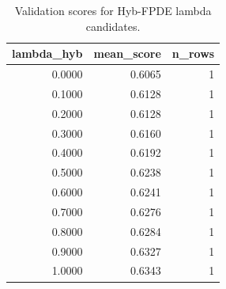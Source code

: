 \begin{table}[t]
\caption{Validation scores for Hyb-FPDE lambda candidates.}
\label{tab:lambda_distribution_computed}
\centering
\begin{tabular}{rrr}
\toprule
lambda\_hyb & mean\_score & n\_rows \\
\midrule
0.0000 & 0.6065 & 1 \\
0.1000 & 0.6128 & 1 \\
0.2000 & 0.6128 & 1 \\
0.3000 & 0.6160 & 1 \\
0.4000 & 0.6192 & 1 \\
0.5000 & 0.6238 & 1 \\
0.6000 & 0.6241 & 1 \\
0.7000 & 0.6276 & 1 \\
0.8000 & 0.6284 & 1 \\
0.9000 & 0.6327 & 1 \\
1.0000 & 0.6343 & 1 \\
\bottomrule
\end{tabular}

\end{table}
